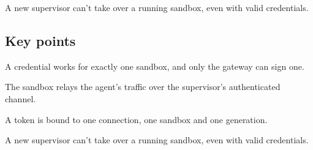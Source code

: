 \begin{takeaway}A new supervisor can't take over a running sandbox, even with valid credentials.\end{takeaway}

\subsection*{Key points}
\bi
\item A credential works for exactly one sandbox, and only the gateway can sign one.
\item The sandbox relays the agent's traffic over the supervisor's authenticated channel.
\item A token is bound to one connection, one sandbox and one generation.
\item A new supervisor can't take over a running sandbox, even with valid credentials.
\ei
